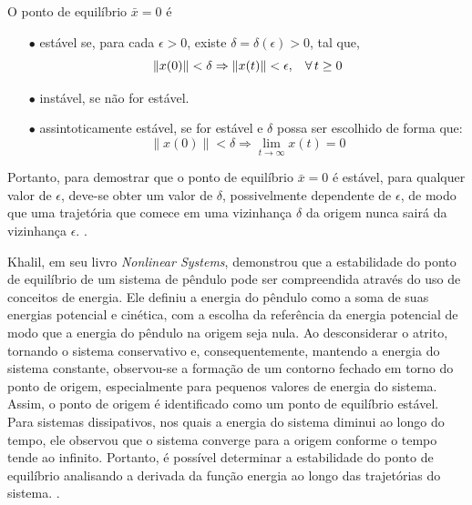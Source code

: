 \begin{definition}
  O ponto de equilíbrio $\bar{x} = 0$ é

  \begin{enumerate}
    \item[$\bullet$] estável se, para cada $\epsilon > 0$, existe $\delta = \delta(\epsilon) > 0$, tal que,
          $$ \lVert x(0)\rVert < \delta \Rightarrow \lVert x(t)\rVert < \epsilon, \hspace{0.3cm} \forall \, t \geq 0$$
    \item[$\bullet$] instável, se não for estável.
    \item[$\bullet$] assintoticamente estável, se for estável e $\delta$ possa   ser escolhido de forma que:
          $$ \lVert x(0)\rVert < \delta \Rightarrow \lim_{t \rightarrow \infty}x(t) = 0$$
  \end{enumerate}
\end{definition}

Portanto, para demostrar que o ponto de equilíbrio $\bar{x} = 0$ é estável, para qualquer valor de $\epsilon$, deve-se obter um valor de $\delta$, possivelmente dependente de $\epsilon$, de modo que uma trajetória que comece em uma vizinhança $\delta$ da origem nunca sairá da vizinhança $\epsilon$. \cite{khalil2002}.

Khalil, em seu livro \textit{Nonlinear Systems}, demonstrou que a estabilidade do ponto de equilíbrio de um sistema de pêndulo pode ser compreendida através do uso de conceitos de energia. Ele definiu a energia do pêndulo como a soma de suas energias potencial e cinética, com a escolha da referência da energia potencial de modo que a energia do pêndulo na origem seja nula. Ao desconsiderar o atrito, tornando o sistema conservativo e, consequentemente, mantendo a energia do sistema constante, observou-se a formação de um contorno fechado em torno do ponto de origem, especialmente para pequenos valores de energia do sistema. Assim, o ponto de origem é identificado como um ponto de equilíbrio estável. Para sistemas dissipativos, nos quais a energia do sistema diminui ao longo do tempo, ele observou que o sistema converge para a origem conforme o tempo tende ao infinito. Portanto, é possível determinar a estabilidade do ponto de equilíbrio analisando a derivada da função energia ao longo das trajetórias do sistema. \cite{khalil2002}.

